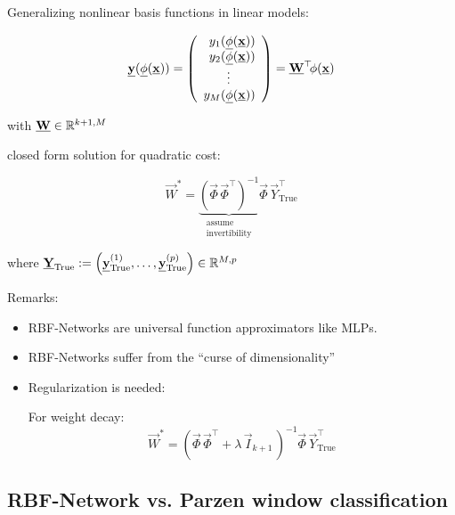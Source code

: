 \begin{frame}\frametitle{\subsecname}

Generalizing nonlinear basis functions in linear models:

\begin{equation}
\underline{\mathbf{y}}(\underline{\mathbf{\phi}}(\underline{\mathbf{x}})) = 
\left( \begin{array}{rrrrrrrrrrrrrrrrrrrrrrrrrr} 
y_1(\underline{\mathbf{\phi}}(\underline{\mathbf{x}}))\\
y_2(\underline{\mathbf{\phi}}(\underline{\mathbf{x}}))\\
\vdots\qquad\\
y_M(\underline{\mathbf{\phi}}(\underline{\mathbf{x}}))
\\ \end{array} \right)
= \underline{\mathbf{W}}^\top \kern-.5ex \phi(\underline{\mathbf{x}})
\end{equation}

with $\underline{\mathbf{W}} \in \mathbb{R}^{k+1,M}$

closed form solution for quadratic cost: 

\begin{equation}
\vec W^{*} =
\underbrace{
\left(\vec \Phi \, \vec \Phi^{\top} \right)^{-1}
}_{
\substack{
\text{assume}\\ \text{invertibility}}
}
\vec \Phi \, \vec Y_{\text{True}}^{\top}
\end{equation}


\pause

where $\underline{\mathbf{Y}}_{\text{True}} := \left( \underline{\mathbf{y}}_{\text{True}}^{(1)},\ldots,\underline{\mathbf{y}}_{\text{True}}^{(p)}\right) \in \mathbb{R}^{M,p}$

\end{frame}

\begin{frame}
Remarks:

\begin{itemize}
\item RBF-Networks are universal function approximators like MLPs.
\item RBF-Networks suffer from the ``curse of dimensionality''
\item Regularization is needed:

For weight decay:
\begin{equation}
\vec W^{*} = \left( \vec \Phi \, \vec \Phi^{\top} + \lambda\,\vec I_{k+1} \,\right)^{-1} \vec \Phi \, \vec Y_{\text{True}}^{\top}
\end{equation}

\end{itemize}

\end{frame}

\subsection{RBF-Network vs. Parzen window classification}

